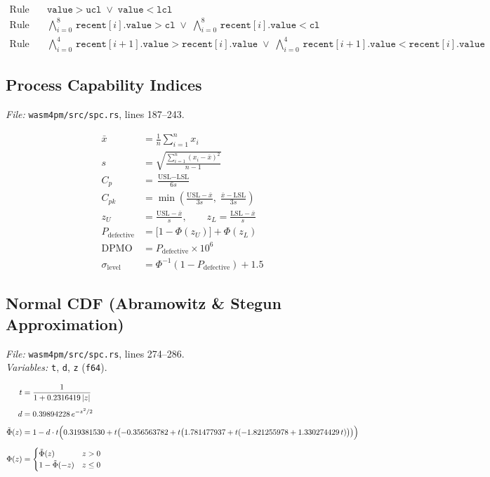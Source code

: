 \documentclass[11pt,a4paper]{article}
\begin{document}
\begin{align}
  \text{Rule 1:}\quad & \texttt{value} > \texttt{ucl} \;\vee\; \texttt{value} < \texttt{lcl} \tag{Out of Control} \\[4pt]
  \text{Rule 2:}\quad & \bigwedge_{i=0}^{8}\,\texttt{recent}[i].\texttt{value} > \texttt{cl}
    \;\vee\;\bigwedge_{i=0}^{8}\,\texttt{recent}[i].\texttt{value} < \texttt{cl} \tag{Shift} \\[4pt]
  \text{Rule 3:}\quad & \bigwedge_{i=0}^{4}\,\texttt{recent}[i+1].\texttt{value} > \texttt{recent}[i].\texttt{value}
    \;\vee\;\bigwedge_{i=0}^{4}\,\texttt{recent}[i+1].\texttt{value} < \texttt{recent}[i].\texttt{value} \tag{Trend}
\end{align}

\subsection{Process Capability Indices}
\textit{File:} \texttt{wasm4pm/src/spc.rs}, lines 187--243.

\begin{align}
  \bar{x} &= \frac{1}{n}\sum_{i=1}^n x_i \\[4pt]
  s &= \sqrt{\frac{\sum_{i=1}^n (x_i - \bar{x})^2}{n-1}} \\[6pt]
  C_p &= \frac{\text{USL} - \text{LSL}}{6s} \\[6pt]
  C_{pk} &= \min\!\left(\frac{\text{USL}-\bar{x}}{3s},\;\frac{\bar{x}-\text{LSL}}{3s}\right) \\[6pt]
  z_U &= \frac{\text{USL}-\bar{x}}{s}, \qquad
  z_L = \frac{\text{LSL}-\bar{x}}{s} \\[4pt]
  P_\text{defective} &= \bigl[1 - \Phi(z_U)\bigr] + \Phi(z_L) \\[4pt]
  \text{DPMO} &= P_\text{defective}\times 10^6 \\[4pt]
  \sigma_\text{level} &= \Phi^{-1}(1 - P_\text{defective}) + 1.5
\end{align}

\subsection{Normal CDF (Abramowitz \& Stegun Approximation)}
\textit{File:} \texttt{wasm4pm/src/spc.rs}, lines 274--286.\\
\textit{Variables:} \texttt{t}, \texttt{d}, \texttt{z} (\texttt{f64}).

\begin{align}
  t &= \frac{1}{1 + 0.2316419\,|z|} \\[4pt]
  d &= 0.39894228\,e^{-z^2/2} \\[4pt]
  \tilde\Phi(z) &= 1 - d\cdot t\Bigl(0.319381530
    + t\bigl(-0.356563782
    + t\bigl(1.781477937
    + t(-1.821255978
    + 1.330274429\,t)\bigr)\bigr)\Bigr) \\[6pt]
  \Phi(z) &=
  \begin{cases}
    \tilde\Phi(z) & z > 0 \\
    1 - \tilde\Phi(-z) & z \leq 0
  \end{cases}
\end{align}
\end{document}
